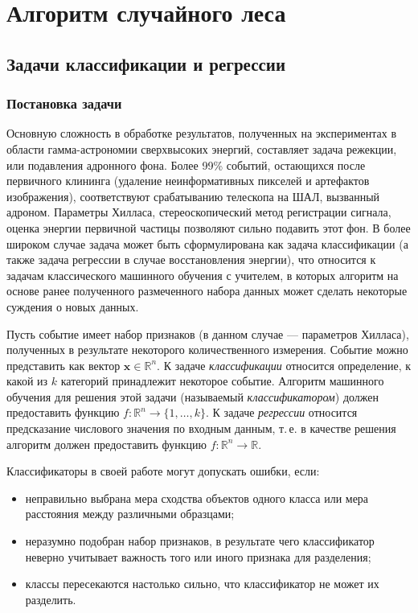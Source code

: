 \documentclass[magd,floatypics,numeref]{msudipl} %
\begin{document}
\chapter{Алгоритм случайного леса}
\section{Задачи классификации и регрессии}
\subsection{Постановка задачи}
Основную сложность в обработке результатов, полученных на экспериментах в области гамма-астрономии сверхвысоких энергий, составляет задача режекции, или подавления адронного фона. Более 99\% событий, остающихся после первичного клининга (удаление неинформативных пикселей и артефактов изображения), соответствуют срабатыванию телескопа на ШАЛ, вызванный адроном. Параметры Хилласа, стереоскопический метод регистрации сигнала, оценка энергии первичной частицы позволяют сильно подавить этот фон. В более широком случае задача может быть сформулирована как задача классификации (а также задача регрессии в случае восстановления энергии), что относится к задачам классического машинного обучения с учителем, в которых алгоритм на основе ранее полученного размеченного набора данных может сделать некоторые суждения о новых данных. 

Пусть событие имеет набор признаков (в данном случае --- параметров Хилласа), полученных в результате некоторого количественного измерения. Событие можно представить как вектор 
$\mathbf{x}\in \mathds{R}^n$. К задаче \textit{классификации} относится определение, к какой из $k$ категорий принадлежит некоторое событие. Алгоритм машинного обучения для решения этой задачи (называемый \textit{классификатором}) должен предоставить функцию $f: \mathds{R}^n \rightarrow \{ 1, \dots, k\}$. К задаче \textit{регрессии} относится предсказание числового значения по входным данным, т.\,е. в качестве решения алгоритм должен предоставить функцию $f: \mathds{R}^n \rightarrow  \mathds{R}$. 

Классификаторы в своей работе могут допускать ошибки, если:
\begin{itemize}
\item неправильно выбрана мера сходства объектов одного класса или мера расстояния между различными образцами;
\item неразумно подобран набор признаков, в результате чего классификатор неверно учитывает важность того или иного признака для разделения;
\item классы пересекаются настолько сильно, что классификатор не может их разделить.
\end{itemize}
\end{document}
